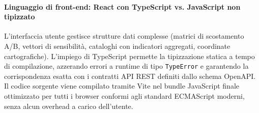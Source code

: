 \paragraph{Linguaggio di front-end: React con TypeScript vs. JavaScript non tipizzato}
L'interfaccia utente gestisce strutture dati complesse (matrici di scostamento A/B, vettori di sensibilità, cataloghi con indicatori aggregati, coordinate cartografiche). L'impiego di TypeScript permette la tipizzazione statica a tempo di compilazione, azzerando errori a runtime di tipo \texttt{TypeError} e garantendo la corrispondenza esatta con i contratti API REST definiti dallo schema OpenAPI. Il codice sorgente viene compilato tramite Vite nel bundle JavaScript finale ottimizzato per tutti i browser conformi agli standard ECMAScript moderni, senza alcun overhead a carico dell'utente.
